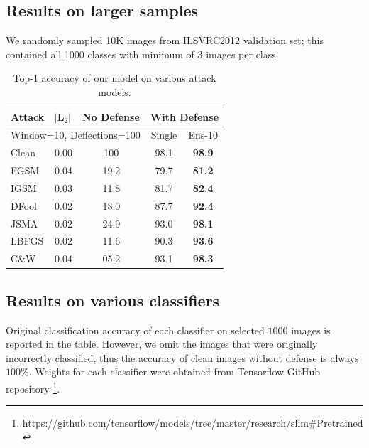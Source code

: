 \subsection{Results on larger samples}
We randomly sampled 10K images from ILSVRC2012 validation set; this contained all 1000 classes with minimum of $3$ images per class.

\begin{table}[H]
\centering
{}
\begin{tabular}{lcccc}
\textbf{Attack} & \multicolumn{1}{l}{$|\boldsymbol{L}_2|$} & \multicolumn{1}{l}{\textbf{No Defense}} & \multicolumn{2}{l}{\textbf{With Defense}} \\ \hline
 \multicolumn{3}{l}{Window=10, Deflections=100}  & Single & Ens-10 \\ \hline 
\small{Clean} & 0.00 & 100 & 98.1 & \textbf{98.9} \\ 
\small{FGSM} & 0.04 & 19.2 & 79.7 & \textbf{81.2} \\
\small{IGSM} & 0.03 & 11.8 & 81.7 & \textbf{82.4} \\
\small{DFool} & 0.02 & 18.0 & 87.7 & \textbf{92.4} \\
\small{JSMA} & 0.02 & 24.9 & 93.0 & \textbf{98.1} \\
\small{LBFGS} & 0.02 & 11.6 & 90.3 & \textbf{93.6} \\
\small{C\&W} & 0.04 & 05.2 & 93.1 & \textbf{98.3}   \\ \hline
\end{tabular}
\caption[Accuracy Under Various Attacks]{Top-1 accuracy of our model on various attack models.}
\end{table}

\subsection{Results on various classifiers}
Original classification accuracy of each classifier on selected $1000$ images is reported in the table.
However, we omit the images that were originally incorrectly classified, thus the accuracy of clean images without defense is always $100\%$.
Weights for each classifier were obtained from Tensorflow GitHub repository
\footnote{https://github.com/tensorflow/models/tree/master/research/slim\#Pretrained}. \\

